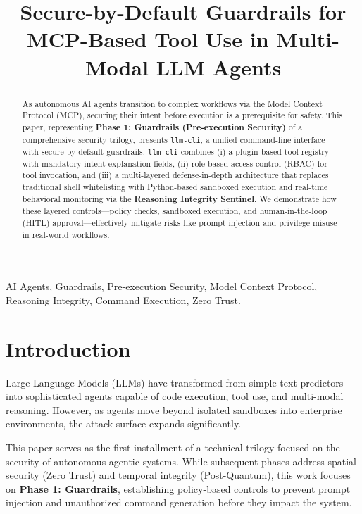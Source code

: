 \documentclass[conference]{IEEEtran}
\begin{document}
\title{Secure-by-Default Guardrails for MCP-Based Tool Use in Multi-Modal LLM Agents}

\author{
}

\maketitle

\begin{abstract}
As autonomous AI agents transition to complex workflows via the Model Context Protocol (MCP), securing their intent before execution is a prerequisite for safety. This paper, representing \textbf{Phase 1: Guardrails (Pre-execution Security)} of a comprehensive security trilogy, presents \texttt{llm-cli}, a unified command-line interface with secure-by-default guardrails. \texttt{llm-cli} combines (i) a plugin-based tool registry with mandatory intent-explanation fields, (ii) role-based access control (RBAC) for tool invocation, and (iii) a multi-layered defense-in-depth architecture that replaces traditional shell whitelisting with Python-based sandboxed execution and real-time behavioral monitoring via the \textbf{Reasoning Integrity Sentinel}. We demonstrate how these layered controls---policy checks, sandboxed execution, and human-in-the-loop (HITL) approval---effectively mitigate risks like prompt injection and privilege misuse in real-world workflows.
\end{abstract}

\begin{IEEEkeywords}
AI Agents, Guardrails, Pre-execution Security, Model Context Protocol, Reasoning Integrity, Command Execution, Zero Trust.
\end{IEEEkeywords}

\section{Introduction}
Large Language Models (LLMs) have transformed from simple text predictors into sophisticated agents capable of code execution, tool use, and multi-modal reasoning. However, as agents move beyond isolated sandboxes into enterprise environments, the attack surface expands significantly.

This paper serves as the first installment of a technical trilogy focused on the security of autonomous agentic systems. While subsequent phases address spatial security (Zero Trust) and temporal integrity (Post-Quantum), this work focuses on \textbf{Phase 1: Guardrails}, establishing policy-based controls to prevent prompt injection and unauthorized command generation before they impact the system.
\end{document}
